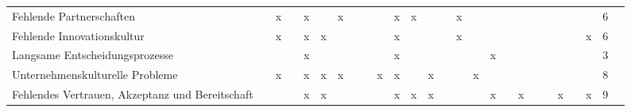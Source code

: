 \begin{sidewaystable}[ht]
\begin{tabular}{|p{6.5cm}|c|c|c|c|c|c|c|c|c|c|c|c|c|c|c|c|c|c|c|c|c|c|c|c|c|}
		Fehlende Partnerschaften                        &                   & x                  &                    & x                    &                    & x                 &                   &                      &                    & x                    & x                &                  &                     & x                &                 &                      &                    &                 &                  &                  &                        &                      &                        & 6  \\
		Fehlende Innovationskultur                      &                   & x                  &                    & x                    & x                  &                   &                   &                      &                    & x                    &                  &                  &                     & x                &                 &                      &                    &                 &                  &                  &                        &                      & x                      & 6  \\
		Langsame Entscheidungsprozesse                  &                   &                    &                    & x                    &                    &                   &                   &                      &                    & x                    &                  &                  &                     &                  &                 & x                    &                    &                 &                  &                  &                        &                      &                        & 3  \\
		Unternehmenskulturelle Probleme                 &                   & x                  &                    & x                    & x                  & x                 &                   &                      & x                  & x                    &                  & x                &                     &                  & x               &                      &                    &                 &                  &                  &                        &                      &                        & 8  \\
		Fehlendes Vertrauen, Akzeptanz und Bereitschaft &                   &                    &                    & x                    & x                  &                   &                   &                      &                    & x                    & x                & x                &                     &                  &                 & x                    &                    & x               &                  &                  & x                      &                      & x                      & 9  \\

\end{tabular}
\end{sidewaystable}
